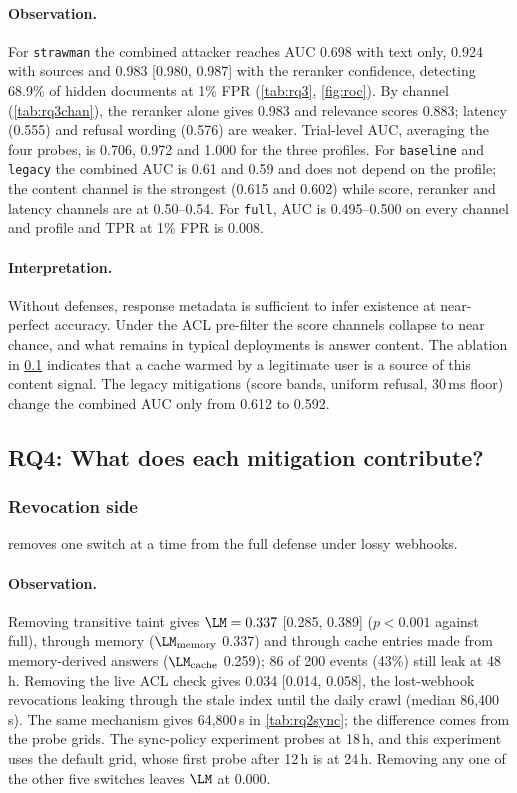 \paragraph{Observation.}
For \texttt{strawman} the combined attacker reaches AUC 0.698 with text only, 0.924 with sources and 0.983 [0.980, 0.987] with the reranker confidence, detecting 68.9\% of hidden documents at 1\% FPR (\cref{tab:rq3}, \cref{fig:roc}). By channel (\cref{tab:rq3chan}), the reranker alone gives 0.983 and relevance scores 0.883; latency (0.555) and refusal wording (0.576) are weaker. Trial-level AUC, averaging the four probes, is 0.706, 0.972 and 1.000 for the three profiles. For \texttt{baseline} and \texttt{legacy} the combined AUC is 0.61 and 0.59 and does not depend on the profile; the content channel is the strongest (0.615 and 0.602) while score, reranker and latency channels are at 0.50--0.54. For \texttt{full}, AUC is 0.495--0.500 on every channel and profile and TPR at 1\% FPR is 0.008.

\paragraph{Interpretation.}
Without defenses, response metadata is sufficient to infer existence at near-perfect accuracy. Under the ACL pre-filter the score channels collapse to near chance, and what remains in typical deployments is answer content. The ablation in \cref{sec:rq4} indicates that a cache warmed by a legitimate user is a source of this content signal. The legacy mitigations (score bands, uniform refusal, 30\,ms floor) change the combined AUC only from 0.612 to 0.592.

\subsection{RQ4: What does each mitigation contribute?}
\label{sec:rq4}

\subsubsection{Revocation side}
 removes one switch at a time from the full defense under lossy webhooks.



\paragraph{Observation.}
Removing transitive taint gives $\LM=0.337$ [0.285, 0.389] ($p<0.001$ against full), through memory ($\LM_{\text{memory}}$ 0.337) and through cache entries made from memory-derived answers ($\LM_{\text{cache}}$ 0.259); 86 of 200 events (43\%) still leak at 48\,h. Removing the live ACL check gives 0.034 [0.014, 0.058], the lost-webhook revocations leaking through the stale index until the daily crawl (median 86{,}400\,s). The same mechanism gives 64{,}800\,s in \cref{tab:rq2sync}; the difference comes from the probe grids. The sync-policy experiment probes at 18\,h, and this experiment uses the default grid, whose first probe after 12\,h is at 24\,h. Removing any one of the other five switches leaves $\LM$ at 0.000.

